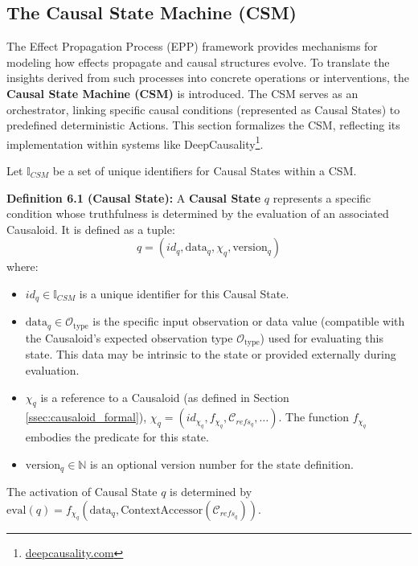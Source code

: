 \subsection[The Causal State Machine (CSM) ]{The Causal State Machine (CSM)}
\label{sec:formalization_csm}

The Effect Propagation Process (EPP) framework provides mechanisms for modeling how effects propagate and causal structures evolve. To translate the insights derived from such processes into concrete operations or interventions, the \textbf{Causal State Machine (CSM)} is introduced. The CSM serves as an orchestrator, linking specific causal conditions (represented as Causal States) to predefined deterministic Actions. This section formalizes the CSM, reflecting its implementation within systems like DeepCausality\footnote{\url{deepcausality.com}}.

Let \(\mathbb{I}_{CSM}\) be a set of unique identifiers for Causal States within a CSM.

\noindent\textbf{Definition 6.1 (Causal State):} A \textbf{Causal State} \(q\) represents a specific condition whose truthfulness is determined by the evaluation of an associated Causaloid. It is defined as a tuple:
\[ q = (id_q, \text{data}_q, \chi_q, \text{version}_q) \]
where:
\begin{itemize}
    \item \( id_q \in \mathbb{I}_{CSM} \) is a unique identifier for this Causal State.
    \item \( \text{data}_q \in \mathcal{O}_{\text{type}} \) is the specific input observation or data value (compatible with the Causaloid's expected observation type \(\mathcal{O}_{\text{type}}\)) used for evaluating this state. This data may be intrinsic to the state or provided externally during evaluation.
    \item \( \chi_q \) is a reference to a Causaloid (as defined in Section \ref{ssec:causaloid_formal}), \( \chi_q = (id_{\chi_q}, f_{\chi_q}, \mathcal{C}_{refs_q}, \dots) \). The function \(f_{\chi_q}\) embodies the predicate for this state.
    \item \( \text{version}_q \in \mathbb{N} \) is an optional version number for the state definition.
\end{itemize}
The activation of Causal State \(q\) is determined by \( \text{eval}(q) = f_{\chi_q}(\text{data}_q, \text{ContextAccessor}(\mathcal{C}_{refs_q})) \).

\newpage

